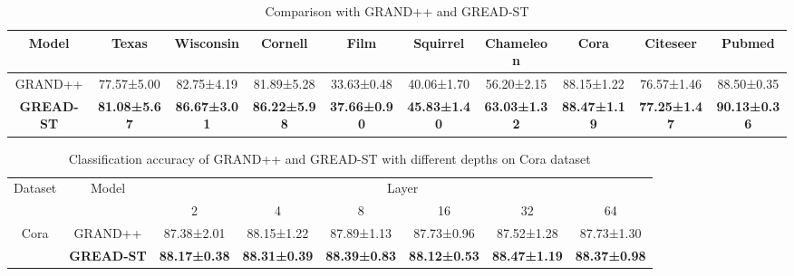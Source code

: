 \documentclass{article}
\theoremstyle{plain}
\theoremstyle{definition}
\theoremstyle{remark}
\newcommand{\std}{\scriptsize{}}
\begin{document}
\begin{table}[h!]
    \setlength{\tabcolsep}{2pt}
    \centering
    \caption{Comparison with GRAND++ and GREAD-ST}
    \begin{tabular}{c ccccccccc}\toprule
        Model    & Texas & Wisconsin & Cornell & Film & Squirrel & Chameleon & Cora & Citeseer & Pubmed\\\midrule
        GRAND++  & 77.57\std{±5.00} & 82.75\std{±4.19} & 81.89\std{±5.28} & 33.63\std{±0.48} & 40.06\std{±1.70} & 56.20\std{±2.15} & 88.15\std{±1.22} & 76.57\std{±1.46} & 88.50\std{±0.35}\\
        \textbf{GREAD-ST} & \textbf{81.08\std{±5.67}} & \textbf{86.67\std{±3.01}} & \textbf{86.22\std{±5.98}} & \textbf{37.66\std{±0.90}} & \textbf{45.83\std{±1.40}} & \textbf{63.03\std{±1.32}} & \textbf{88.47\std{±1.19}} & \textbf{77.25\std{±1.47}} & \textbf{90.13\std{±0.36}}\\\bottomrule
    \end{tabular}
    \label{tab:gread-st}
\end{table}

\begin{table}[h]
    \centering
    \caption{Classification accuracy of GRAND++ and GREAD-ST with different depths on Cora dataset}
    \begin{tabular}{cc cccccc}\toprule
        \multirow{2}{*}{Dataset} & \multirow{2}{*}{Model} & \multicolumn{6}{c}{Layer}\\\cmidrule{3-8} 
                &       & 2 & 4 & 8 & 16 & 32 & 64\\ \midrule
        \multirow{2}{*}{Cora}    
        & GRAND++ & 87.38\std{±2.01} & 88.15\std{±1.22} & 87.89\std{±1.13} & 87.73\std{±0.96} & 87.52\std{±1.28} & 87.73\std{±1.30}\\ 
        & \textbf{GREAD-ST} & \textbf{88.17\std{±0.38}} & \textbf{88.31\std{±0.39}} & \textbf{88.39\std{±0.83}} & \textbf{88.12\std{±0.53}} & \textbf{88.47\std{±1.19}} & \textbf{88.37\std{±0.98}}\\ \bottomrule
    \end{tabular}
    \label{tab:gread-st-depth}
\end{table}
\end{document}
